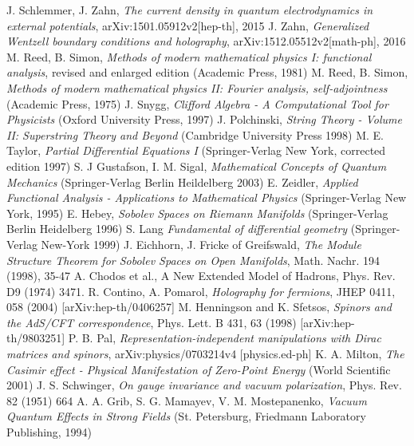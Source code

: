 \documentclass[11pt, oneside]{report}   	%
\title{}
\author{}
\theoremstyle{remark}
\begin{document}

%
%


\begin{thebibliography}{9}
 J. Schlemmer, J. Zahn, \textit{The current density in quantum electrodynamics in external potentials}, arXiv:1501.05912v2[hep-th], 2015
 J. Zahn, \textit{Generalized Wentzell boundary conditions and holography}, arXiv:1512.05512v2[math-ph], 2016
 M. Reed, B. Simon, \textit{Methods of modern mathematical physics I: functional analysis}, revised and enlarged edition (Academic Press, 1981)
 M. Reed, B. Simon, \textit{Methods of modern mathematical physics II: Fourier analysis, self-adjointness} (Academic Press, 1975)
 J. Snygg, \textit{Clifford Algebra - A Computational Tool for Physicists} (Oxford University Press, 1997)
 J. Polchinski, \textit{String Theory - Volume II: Superstring Theory and Beyond} (Cambridge University Press 1998)
 M. E. Taylor, \textit{Partial Differential Equations I} (Springer-Verlag New York, corrected edition 1997)
 S. J Gustafson, I. M. Sigal, \textit{Mathematical Concepts of Quantum Mechanics} (Springer-Verlag Berlin Heildelberg 2003)
 E. Zeidler, \textit{Applied Functional Analysis - Applications to Mathematical Physics} (Springer-Verlag New York, 1995)
 E. Hebey, \textit{Sobolev Spaces on Riemann Manifolds} (Springer-Verlag Berlin Heidelberg 1996)
 S. Lang \textit{Fundamental of differential geometry} (Springer-Verlag New-York 1999)
 J. Eichhorn, J. Fricke of Greifswald, \textit{The Module Structure Theorem for Sobolev Spaces on Open Manifolds}, Math. Nachr. 194 (1998), 35-47 
 A. Chodos et al., A New Extended Model of Hadrons, Phys. Rev. D9 (1974) 3471.
 R. Contino, A. Pomarol, \textit{Holography for fermions}, JHEP 0411, 058 (2004) [arXiv:hep-th/0406257]
 M. Henningson and K. Sfetsos, \textit{Spinors and the AdS/CFT correspondence}, Phys. Lett. B 431, 63 (1998) [arXiv:hep-th/9803251]
 P. B. Pal, \textit{Representation-independent manipulations with Dirac matrices and spinors}, arXiv:physics/0703214v4 [physics.ed-ph]
 K. A. Milton, \textit{The Casimir effect - Physical Manifestation of Zero-Point Energy} (World Scientific 2001)
 J. S. Schwinger, \textit{On gauge invariance and vacuum polarization}, Phys. Rev. 82 (1951) 664
 A. A. Grib, S. G. Mamayev, V. M. Mostepanenko, \textit{Vacuum Quantum Effects in Strong Fields} (St. Petersburg, Friedmann Laboratory Publishing, 1994)\end{thebibliography}
\end{document}
